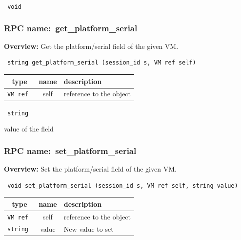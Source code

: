 \vspace{0.3cm}

{\tt 
void
}



\vspace{0.3cm}
\vspace{0.3cm}
\vspace{0.3cm}
\subsubsection{RPC name:~get\_platform\_serial}

{\bf Overview:} 
Get the platform/serial field of the given VM.

\begin{verbatim} string get_platform_serial (session_id s, VM ref self)\end{verbatim}



 
\vspace{0.3cm}
\begin{tabular}{|c|c|p{7cm}|}
 \hline
{\bf type} & {\bf name} & {\bf description} \\ \hline
{\tt VM ref } & self & reference to the object \\ \hline 

\end{tabular}

\vspace{0.3cm}

{\tt 
string
}


value of the field
\vspace{0.3cm}
\vspace{0.3cm}
\vspace{0.3cm}
\subsubsection{RPC name:~set\_platform\_serial}

{\bf Overview:} 
Set the platform/serial field of the given VM.

\begin{verbatim} void set_platform_serial (session_id s, VM ref self, string value)\end{verbatim}



 
\vspace{0.3cm}
\begin{tabular}{|c|c|p{7cm}|}
 \hline
{\bf type} & {\bf name} & {\bf description} \\ \hline
{\tt VM ref } & self & reference to the object \\ \hline 

{\tt string } & value & New value to set \\ \hline 

\end{tabular}


